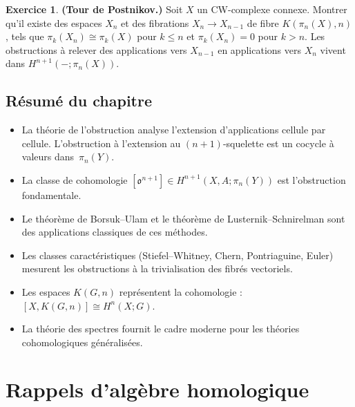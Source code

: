 \documentclass[12pt,a4paper,openany]{book}
\theoremstyle{definition}
\newtheorem{exercice}{Exercice}[chapter]
\theoremstyle{plain}
\theoremstyle{remark}
\begin{document}
\begin{exercice}\label{exo:obstruction-10}
  \textbf{(Tour de Postnikov.)}
  Soit $X$ un CW-complexe connexe. Montrer qu'il existe des espaces $X_n$ et
  des fibrations $X_n \to X_{n-1}$ de fibre $K(\pi_n(X), n)$, tels que
  $\pi_k(X_n) \cong \pi_k(X)$ pour $k \leq n$ et $\pi_k(X_n) = 0$ pour $k > n$.
  Les obstructions à relever des applications vers $X_{n-1}$ en applications vers
  $X_n$ vivent dans $H^{n+1}(-; \pi_n(X))$.
\end{exercice}

\section*{Résumé du chapitre}

\begin{itemize}
  \item La théorie de l'obstruction analyse l'extension d'applications cellule par
        cellule. L'obstruction à l'extension au $(n{+}1)$-squelette est un cocycle
        à valeurs dans~$\pi_n(Y)$.
  \item La classe de cohomologie $[\mathfrak{o}^{n+1}] \in H^{n+1}(X, A; \pi_n(Y))$
        est l'obstruction fondamentale.
  \item Le théorème de Borsuk--Ulam et le théorème de Lusternik--Schnirelman sont
        des applications classiques de ces méthodes.
  \item Les classes caractéristiques (Stiefel--Whitney, Chern, Pontriaguine, Euler)
        mesurent les obstructions à la trivialisation des fibrés vectoriels.
  \item Les espaces $K(G,n)$ représentent la cohomologie :
        $[X, K(G,n)] \cong H^n(X; G)$.
  \item La théorie des spectres fournit le cadre moderne pour les théories
        cohomologiques généralisées.
\end{itemize}



\appendix
\chapter{Rappels d'algèbre homologique}\label{app:algebre-homologique}
\end{document}
